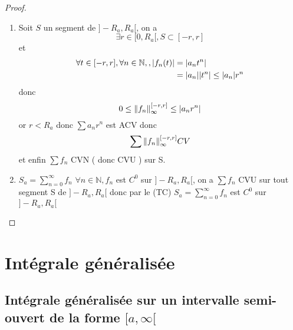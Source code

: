\documentclass[11pt,hidelinks]{book}
\theoremstyle{mytheoremstyle}
\theoremstyle{mytheoremstyle}
\theoremstyle{mytheoremstyle}
\theoremstyle{mytheoremstyle}
\theoremstyle{mytheoremstyle}
\theoremstyle{mytheoremstyle}
\theoremstyle{mytheoremstyle}
\theoremstyle{mytheoremstyle}
\theoremstyle{myproblemstyle}
\def\mbb#1{\mathbb{#1}}
\def\bN{\mbb{N}}
\def\is#1{\sum_{n=0}^\infty #1}
\def\fn{\forall n \in \bN,}
\begin{document}
\begin{adjustwidth}{-2em}{-1em}
\begin{theorem}
\begin{proof}
\begin{enumerate}
            \item Soit $S$ un segment de $]-R_a, R_a[$, on a 
            \begin{equation*}
                \exists r \in [0,R_a[, S \subset [-r,r]
            \end{equation*} 
            et 
            \begin{align*}
                \forall t \in [-r,r], \fn, \abs{f_n(t)} &= \abs{a_nt^n} \\
                &= \abs{a_n} \abs{t^n} \leq \abs{a_n} r^n
            \end{align*}
            donc 
            \begin{equation*}
                0 \leq \norm{f_n}^{[-r,r]}_{\infty} \leq \abs{a_nr^n}
            \end{equation*}
            or $r < R_a$ donc $\sum a_n r^n$ est ACV 
            donc 
            \begin{equation}
                \sum \norm{f_n}^{[-r,r]}_{\infty} CV
            \end{equation}
            et enfin $\sum f_n$ CVN ( donc CVU ) sur S. 

            \item $S_a = \is{f_n}$\newline
            $\fn f_n$ est $C^0$ sur $]-R_a, R_a[$, on a\newline
            $\sum f_n$ CVU sur tout segment S de $]-R_a, R_a[$ donc par le (TC)\newline
            $S_a = \is{f_n}$ est $C^0$ sur $]-R_a, R_a[$
            \end{enumerate}
        \end{proof}
    \end{theorem}
\end{adjustwidth}
\newpage
\chapter{Intégrale généralisée}
\section{Intégrale généralisée sur un intervalle semi-ouvert de la forme $[a,\infty[$}
\end{document}
